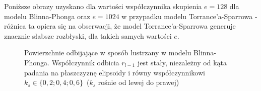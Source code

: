 Poniższe obrazy uzyskano dla wartości współczynnika skupienia $e=128$ dla modelu Blinna-Phonga oraz $e=1024$ w przypadku modelu Torrance'a-Sparrowa - różnica ta opiera się na obserwacji, że model Torrance'a-Sparrowa generuje znacznie słabsze rozbłyski, dla takich samych wartości $e$.

\begin{figure}[H]
\centering
{}
\caption[Powierzchnie odbijające w sposób lustrzany]{Powierzchnie odbijające w sposób lustrzany w modelu Blinna-Phonga. Współczynnik odbicia $r_{l-1}$ jest stały, niezależny od kąta padania na płaszczyznę elipsoidy i równy współczynnikowi $k_s\in\lbrace 0,2; 0,4; 0,6 \rbrace$~($k_s$ rośnie od lewej do prawej)}
\label{ch3:img:reflection_types_specular}
\end{figure}

